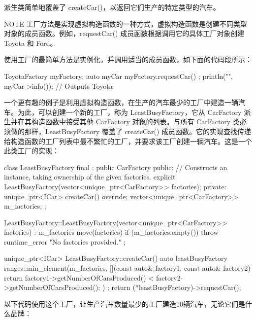 派生类简单地覆盖了 createCar()，以返回它们生产的特定类型的汽车。

\begin{myNotic}{NOTE}
工厂方法是实现虚拟构造函数的一种方式，虚拟构造函数是创建不同类型对象的成员函数。例如，requestCar() 成员函数根据调用它的具体工厂对象创建 Toyota 和 Ford。
\end{myNotic}


使用工厂的最简单方法是实例化，并调用适当的成员函数，如下面的代码段所示：

\begin{cpp}
ToyotaFactory myFactory;
auto myCar { myFactory.requestCar() };
println("{}", myCar->info()); // Outputs Toyota
\end{cpp}

一个更有趣的例子是利用虚拟构造函数，在生产的汽车最少的工厂中建造一辆汽车。为此，可以创建一个新的工厂，称为 LeastBusyFactory，它从 CarFactory 派生并在其构造函数中接受其他 CarFactory 对象的列表。与所有 CarFactory 类必须做的那样，LeastBusyFactory 覆盖了 createCar() 成员函数。它的实现查找传递给构造函数的工厂列表中最不繁忙的工厂，并要求该工厂创建一辆汽车。这是一个此类工厂的实现：

\begin{cpp}
class LeastBusyFactory final : public CarFactory
{
    public:
        // Constructs an instance, taking ownership of the given factories.
        explicit LeastBusyFactory(vector<unique_ptr<CarFactory>> factories);
    private:
        unique_ptr<ICar> createCar() override;
        vector<unique_ptr<CarFactory>> m_factories;
};

LeastBusyFactory::LeastBusyFactory(vector<unique_ptr<CarFactory>> factories)
    : m_factories { move(factories) }
{
    if (m_factories.empty()) {
        throw runtime_error { "No factories provided." };
    }
}

unique_ptr<ICar> LeastBusyFactory::createCar()
{
    auto leastBusyFactory { ranges::min_element(m_factories,
        [](const auto& factory1, const auto& factory2) {
            return factory1->getNumberOfCarsProduced() <
                factory2->getNumberOfCarsProduced(); }) };
    return (*leastBusyFactory)->requestCar();
}
\end{cpp}

以下代码使用这个工厂，让生产汽车数量最少的工厂建造10辆汽车，无论它们是什么品牌：


